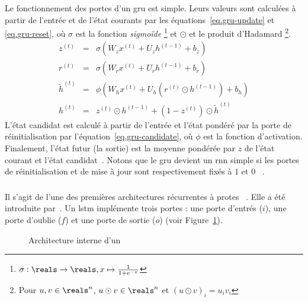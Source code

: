 Le fonctionnement des portes d'un \gls{gru} est simple.
Leurs valeurs sont calculées à partir de l'entrée et de l'état courants par
les équations~\ref{eq.gru-update} et \ref{eq.gru-reset}, 
où \(\sigma\) est la fonction \emph{sigmoïde}%
\footnote{\(\sigma:\reals\to\reals, x\mapsto\frac{1}{1+e^{-x}}\)}
et \(\odot\) et le produit d'Hadamard%
\footnote{Pour \(u, v\in\reals^n\), \(u\odot v\in\reals^n\) et \((u\odot v)_i = u_i v_i\)}.
\begin{eqnarray}
    \label{eq.gru-update}
    z^{(t)}  &=&\sigma\left(W_z x^{(t)}+U_z h^{(t-1)}+b_z\right) \\
    \label{eq.gru-reset}
    r^{(t)}  &=&\sigma\left(W_r x^{(t)}+U_r h^{(t-1)}+b_r\right) \\
    \label{eq.gru-candidate}
    \tilde{h}^{(t)}  &=&\phi\left(W_h x^{(t)}+U_h\left(r^{(t)} \odot h^{(t-1)}\right)+b_h\right) \\
    \label{eq.gru-out}
    h^{(t)}  &=&z^{(t)} \odot h^{(t-1)}+\left(1-z^{(t)}\right) \odot \tilde{h}^{(t)}
\end{eqnarray}
L'état candidat est calculé à partir de l'entrée et l'état pondéré par la porte de réinitialisation
par l'équation~\ref{eq.gru-candidate}, où \(\phi\) est la fonction d'activation.
Finalement, l'état futur (la sortie) est la moyenne pondérée par \(z\) 
de l'état courant et l'état candidat~\cite{Cho_van_Merrienboer_Bahdanau_Bengio_2014}.
Notons que le \gls{gru} devient un \gls{rnn} simple 
si les portes de réinitialisation et de mise à jour sont respectivement fixés à \(1\) et \(0\)%
~\cite{Fathi_2021}.

\subsubsection{}

Il s'agit de l'une des premières architectures récurrentes à protes%
~\cite{Chung_Gulcehre_Cho_Bengio_2014}.
Elle a été introduite par~\cite{Hochreiter_Schmidhuber_1997}.
Un \gls{lstm} implémente trois portes : 
une porte d'entrés (\(i\)), une porte d'oublie (\(f\)) et une porte de sortie (\(o\))%
(voir Figure~\ref{fig.lstm-circuit}).

\begin{figure}[htb]
    \centering
    \resizebox{8cm}{!}{}
    \caption[Architecture interne d'un ]%
    {Architecture interne d'un ~\cite[Fig. 1a]{Chung_Gulcehre_Cho_Bengio_2014}}
    \label{fig.lstm-circuit}
\end{figure}

